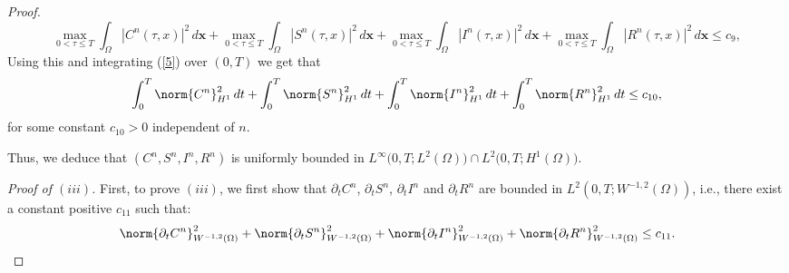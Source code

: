\documentclass[10pt,number,preprint,times]{elsarticle}
\numberwithin{equation}{section} %
\begin{document}
\begin{proof}
\begin{equation}
			\max_{0<\tau\leq T}    \int_{\Omega} |C^n(\tau,x)|^2 \, d\mathbf{x}+ \max_{0<\tau\leq T}    \int_{\Omega} |S^n(\tau,x)|^2 \, d\mathbf{x}+ \max_{0<\tau\leq T}    \int_{\Omega} |I^n(\tau,x)|^2 \, d\mathbf{x}+ \max_{0<\tau\leq T}    \int_{\Omega} |R^n(\tau,x)|^2 \, d\mathbf{x} \leq c_9 
			,
		\end{equation}
		Using this and integrating (\ref{5}) over $(0,T)$ we get that
		\begin{equation}\label{7}
			\int_{0}^T \norm{C^n}_{H^{1}}^2\,dt +\int_{0}^T\norm{S^n}_{H^{1}}^2\,dt +\int_{0}^T\norm{I^n}_{H^{1}}^2\,dt +\int_{0}^T\norm{R^n}_{H^{1}}^2\,dt \leq c_{10}
			,
		\end{equation}
		for some constant $c_{10}>0$ independent of $n$.
		
		
		\noindent
		Thus,  we deduce that $(C^n,S^n, I^n,R^n)$ is uniformly bounded in $L^\infty\big(0,T; L^2(\Omega) \big)  \cap L^2\big(0,T; H^1(\Omega) \big)$.
		
		\textit{Proof of $(iii)$.} First, to prove $(iii)$, we first show that $\partial_tC^n$, $\partial_tS^n$, $\partial_tI^n$ and  $\partial_tR^n$ are bounded in $L^2(0,T; W^{-1,2}(\Omega))$, i.e., there exist a constant positive $c_{11}$ such that:
	\begin{equation}
		{\norm{\partial_tC^n}}_{W^{-1,2}(\Omega)}^2+{\norm{\partial_tS^n}}_{W^{-1,2}(\Omega)}^2+{\norm{\partial_tI^n}}_{W^{-1,2}(\Omega)}^2+{\norm{\partial_tR^n}}_{W^{-1,2}(\Omega)}^2\leq c_{11}. 
	\end{equation}


\end{proof}
\end{document}
